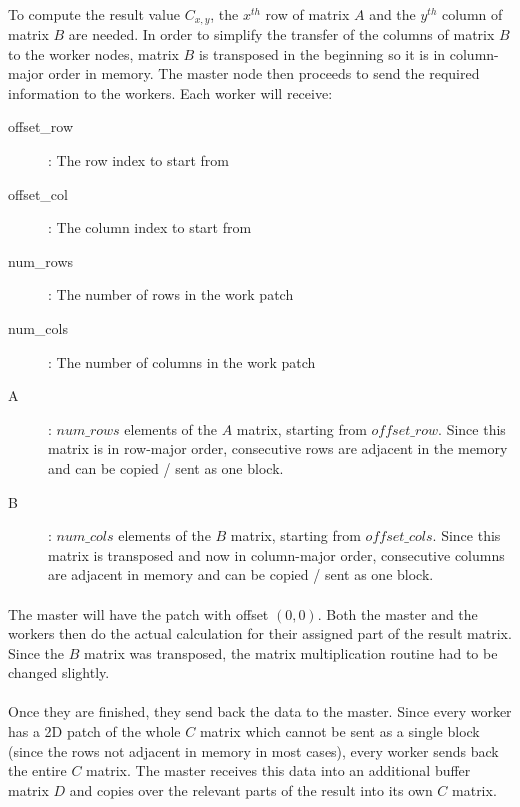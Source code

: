 \documentclass[]{article}
\begin{document}
\paragraph{}
To compute the result value $C_{x,y}$, the $x^{th}$ row of matrix $A$ and the $y^{th}$ column of matrix $B$ are needed.
In order to simplify the transfer of the columns of matrix $B$ to the worker nodes, matrix $B$ is transposed in the beginning so it is in column-major order in memory.
The master node then proceeds to send the required information to the workers. Each worker will receive:
\begin{description}
	\item[offset\_row]: The row index to start from
	\item[offset\_col]: The column index to start from
	\item[num\_rows]: The number of rows in the work patch
	\item[num\_cols]: The number of columns in the work patch
	\item[A]: $num\_rows$ elements of the $A$ matrix, starting from $offset\_row$. Since this matrix is in row-major order, consecutive rows are adjacent in the memory and can be copied / sent as one block.
	\item[B]: $num\_cols$ elements of the $B$ matrix, starting from $offset\_cols$. Since this matrix is transposed and now in column-major order, consecutive columns are adjacent in memory and can be copied / sent as one block.
\end{description}

\paragraph{} The master will have the patch with offset $(0, 0)$. Both the master and the workers then do the actual calculation for their assigned part of the result matrix. Since the $B$ matrix was transposed, the matrix multiplication routine had to be changed slightly.

\paragraph{} Once they are finished, they send back the data to the master. Since every worker has a 2D patch of the whole $C$ matrix which cannot be sent as a single block (since the rows not adjacent in memory in most cases), every worker sends back the entire $C$ matrix. The master receives this data into an additional buffer matrix $D$ and copies over the relevant parts of the result into its own $C$ matrix.
\end{document}
